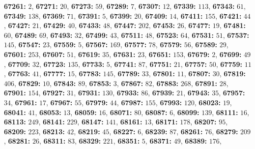 \textsf{\bfseries 67261:} $2$, \textsf{\bfseries 67271:} $20$, \textsf{\bfseries 67273:} $59$, \textsf{\bfseries 67289:} $7$, \textsf{\bfseries 67307:} $12$, \textsf{\bfseries 67339:} $113$, \textsf{\bfseries 67343:} $61$, \textsf{\bfseries 67349:} $138$, \textsf{\bfseries 67369:} $71$, \textsf{\bfseries 67391:} $5$, \textsf{\bfseries 67399:} $20$, \textsf{\bfseries 67409:} $14$, \textsf{\bfseries 67411:} $155$, \textsf{\bfseries 67421:} $44$, \textsf{\bfseries 67427:} $21$, \textsf{\bfseries 67429:} $40$, \textsf{\bfseries 67433:} $48$, \textsf{\bfseries 67447:} $202$, \textsf{\bfseries 67453:} $26$, \textsf{\bfseries 67477:} $19$, \textsf{\bfseries 67481:} $60$, \textsf{\bfseries 67489:} $69$, \textsf{\bfseries 67493:} $32$, \textsf{\bfseries 67499:} $43$, \textsf{\bfseries 67511:} $48$, \textsf{\bfseries 67523:} $64$, \textsf{\bfseries 67531:} $51$, \textsf{\bfseries 67537:} $145$, \textsf{\bfseries 67547:} $23$, \textsf{\bfseries 67559:} $5$, \textsf{\bfseries 67567:} $169$, \textsf{\bfseries 67577:} $78$, \textsf{\bfseries 67579:} $56$, \textsf{\bfseries 67589:} $29$, \textsf{\bfseries 67601:} $253$, \textsf{\bfseries 67607:} $51$, \textsf{\bfseries 67619:} $35$, \textsf{\bfseries 67631:} $23$, \textsf{\bfseries 67651:} $153$, \textsf{\bfseries 67679:} $2$, \textsf{\bfseries 67699:} $49$, \textsf{\bfseries 67709:} $32$, \textsf{\bfseries 67723:} $135$, \textsf{\bfseries 67733:} $5$, \textsf{\bfseries 67741:} $87$, \textsf{\bfseries 67751:} $21$, \textsf{\bfseries 67757:} $50$, \textsf{\bfseries 67759:} $11$, \textsf{\bfseries 67763:} $41$, \textsf{\bfseries 67777:} $15$, \textsf{\bfseries 67783:} $145$, \textsf{\bfseries 67789:} $33$, \textsf{\bfseries 67801:} $11$, \textsf{\bfseries 67807:} $30$, \textsf{\bfseries 67819:} $406$, \textsf{\bfseries 67829:} $10$, \textsf{\bfseries 67843:} $89$, \textsf{\bfseries 67853:} $3$, \textsf{\bfseries 67867:} $82$, \textsf{\bfseries 67883:} $268$, \textsf{\bfseries 67891:} $28$, \textsf{\bfseries 67901:} $154$, \textsf{\bfseries 67927:} $31$, \textsf{\bfseries 67931:} $130$, \textsf{\bfseries 67933:} $86$, \textsf{\bfseries 67939:} $21$, \textsf{\bfseries 67943:} $35$, \textsf{\bfseries 67957:} $34$, \textsf{\bfseries 67961:} $17$, \textsf{\bfseries 67967:} $55$, \textsf{\bfseries 67979:} $44$, \textsf{\bfseries 67987:} $155$, \textsf{\bfseries 67993:} $120$, \textsf{\bfseries 68023:} $19$, \textsf{\bfseries 68041:} $41$, \textsf{\bfseries 68053:} $13$, \textsf{\bfseries 68059:} $16$, \textsf{\bfseries 68071:} $80$, \textsf{\bfseries 68087:} $6$, \textsf{\bfseries 68099:} $139$, \textsf{\bfseries 68111:} $16$, \textsf{\bfseries 68113:} $249$, \textsf{\bfseries 68141:} $229$, \textsf{\bfseries 68147:} $141$, \textsf{\bfseries 68161:} $13$, \textsf{\bfseries 68171:} $178$, \textsf{\bfseries 68207:} $95$, \textsf{\bfseries 68209:} $223$, \textsf{\bfseries 68213:} $42$, \textsf{\bfseries 68219:} $45$, \textsf{\bfseries 68227:} $6$, \textsf{\bfseries 68239:} $87$, \textsf{\bfseries 68261:} $76$, \textsf{\bfseries 68279:} $209$, \textsf{\bfseries 68281:} $26$, \textsf{\bfseries 68311:} $83$, \textsf{\bfseries 68329:} $221$, \textsf{\bfseries 68351:} $5$, \textsf{\bfseries 68371:} $49$, \textsf{\bfseries 68389:} $176$, 
